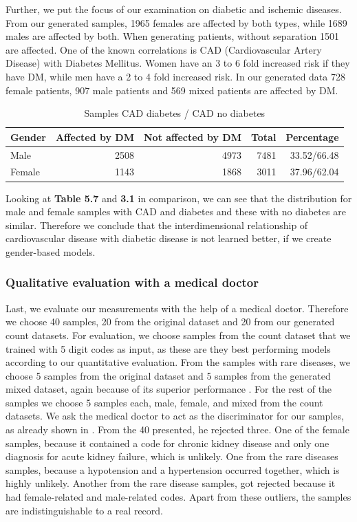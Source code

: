 \documentclass[11pt, a4paper]{book}
\begin{document}
Further, we put the focus of our examination on diabetic and ischemic diseases. 
From our generated samples, 1965 females are affected by both types, while 1689 males are affected by both. When generating patients, without separation 1501 are affected.
One of the known correlations is CAD (Cardiovascular Artery Disease) with Diabetes Mellitus. Women have an 3 to 6 fold increased risk if they have DM, while men have a 2 to 4 fold increased risk. \cite{juutilainen2004gender}
In our generated data 728 female patients, 907 male patients and 569 mixed patients are affected by DM.

\begin{table}
\begin{tabularx}{\textwidth}{X|r|r|r|r}
Gender & Affected by DM & Not affected by DM & Total & Percentage\\
\hline
Male 	& 2508 & 4973 & 7481 & 33.52/66.48\\
Female & 1143 & 1868 & 3011 & 37.96/62.04\\
\end{tabularx}
\caption{\label{tab:cad-diabetic-synth}Samples CAD diabetes / CAD no diabetes}
\end{table}

Looking at \textbf{Table 5.7} and \textbf{3.1} in comparison, we can see that the distribution for male and female samples with CAD and diabetes and these with no diabetes are similar. Therefore we conclude that the interdimensional relationship of cardiovascular disease with diabetic disease is not learned better, if we create gender-based models.

\subsubsection{Qualitative evaluation with a medical doctor}
Last, we evaluate our measurements with the help of a medical doctor. Therefore we choose 40 samples, 20 from the original dataset and 20 from our generated count datasets. For evaluation, we choose samples from the count dataset that we trained with 5 digit codes as input, as these are they best performing models according to our quantitative evaluation. From the samples with rare diseases, we choose 5 samples from the original dataset and 5 samples from the generated mixed dataset, again because of its superior performance . For the rest of the samples we choose 5 samples each, male, female, and mixed from the count datasets.
We ask the medical doctor to act as the discriminator for our samples, as already shown in \cite{Choi2017}. From the 40 presented, he rejected three.
One of the female samples, because it contained a code for chronic kidney disease and only one diagnosis for acute kidney failure, which is unlikely. One from the rare diseases samples, because a hypotension and a hypertension occurred together, which is highly unlikely. Another from the rare disease samples, got rejected because it had female-related and male-related codes.
Apart from these outliers, the samples are indistinguishable to a real record.
\end{document}
